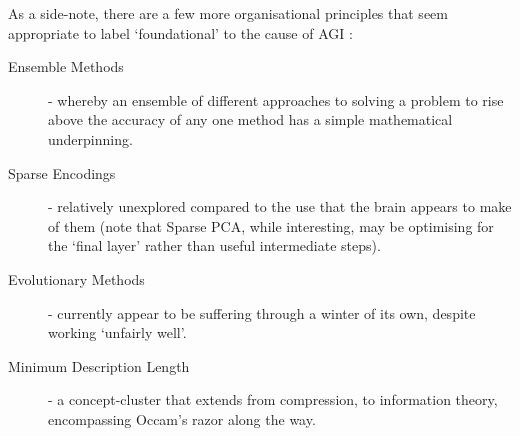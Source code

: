 \documentclass[citeauthoryear]{llncs}
\begin{document}
As a side-note, there are a few more organisational principles that seem appropriate 
to label `foundational' to the cause of AGI :
\begin{description}
\item[Ensemble Methods] - whereby an ensemble of different approaches to 
solving a problem to rise above the accuracy 
of any one method has a simple mathematical underpinning.  
\item[Sparse Encodings] - relatively unexplored compared to the use that 
the brain appears to make of them (note that Sparse PCA, while interesting, 
may be optimising for the `final layer' rather than useful intermediate steps).
\item[Evolutionary Methods] - currently appear to be suffering through 
a winter of its own, despite working `unfairly well'.
\item[Minimum Description Length] - a concept-cluster that extends from compression, 
to information theory, encompassing Occam's razor along the way.
\end{description}

\end{document}
